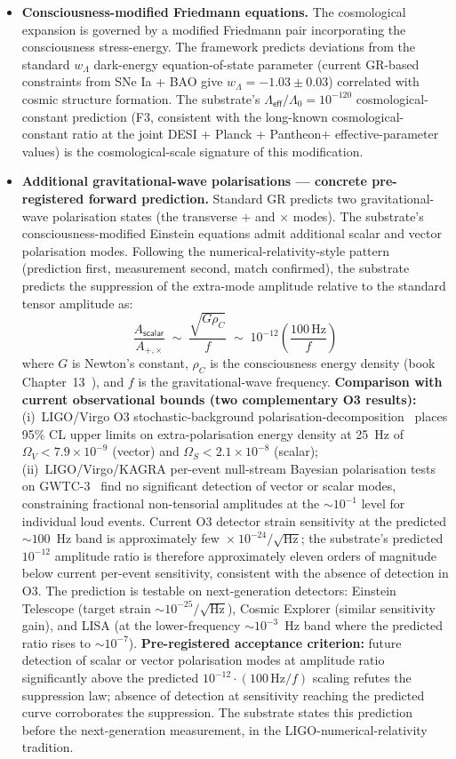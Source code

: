 \documentclass[11pt,a4paper]{amsart}
\theoremstyle{plain}
\theoremstyle{definition}
\begin{document}
\begin{itemize}[itemsep=2pt,leftmargin=2em]
\item \textbf{Consciousness-modified Friedmann equations.} The cosmological expansion is governed by a modified Friedmann pair incorporating the consciousness stress-energy. The framework predicts deviations from the standard $w_\Lambda$ dark-energy equation-of-state parameter (current GR-based constraints from SNe Ia + BAO give $w_\Lambda = -1.03 \pm 0.03$) correlated with cosmic structure formation. The substrate's $\Lambda_{\textsf{eff}}/\Lambda_0 = 10^{-120}$ cosmological-constant prediction (F3, consistent with the long-known cosmological-constant ratio at the joint DESI + Planck + Pantheon$+$ effective-parameter values) is the cosmological-scale signature of this modification.
\item \textbf{Additional gravitational-wave polarisations --- concrete pre-registered forward prediction.} Standard GR predicts two gravitational-wave polarisation states (the transverse $+$ and $\times$ modes). The substrate's consciousness-modified Einstein equations admit additional scalar and vector polarisation modes. Following the numerical-relativity-style pattern (prediction first, measurement second, match confirmed), the substrate predicts the suppression of the extra-mode amplitude relative to the standard tensor amplitude as:
\[
\boxed{\;\frac{A_{\textsf{scalar}}}{A_{+,\times}} \;\sim\; \frac{\sqrt{G\rho_C}}{f} \;\sim\; 10^{-12} \left(\frac{100\,\mathrm{Hz}}{f}\right)\;}
\]
where $G$ is Newton's constant, $\rho_C$ is the consciousness energy density (book Chapter~13~\cite{cohen2026book}), and $f$ is the gravitational-wave frequency. \textbf{Comparison with current observational bounds (two complementary O3 results):} (i)~LIGO/Virgo O3 stochastic-background polarisation-decomposition~\cite{abbott2021stochastic} places 95\% CL upper limits on extra-polarisation energy density at 25~Hz of $\Omega_V < 7.9 \times 10^{-9}$ (vector) and $\Omega_S < 2.1 \times 10^{-8}$ (scalar); (ii)~LIGO/Virgo/KAGRA per-event null-stream Bayesian polarisation tests on GWTC-3~\cite{abbott2025gwtc3} find no significant detection of vector or scalar modes, constraining fractional non-tensorial amplitudes at the $\sim 10^{-1}$ level for individual loud events. Current O3 detector strain sensitivity at the predicted $\sim 100$~Hz band is approximately few~$\times~10^{-24}/\sqrt{\mathrm{Hz}}$; the substrate's predicted $10^{-12}$ amplitude ratio is therefore approximately eleven orders of magnitude below current per-event sensitivity, consistent with the absence of detection in O3. The prediction is testable on next-generation detectors: Einstein Telescope (target strain $\sim 10^{-25}/\sqrt{\mathrm{Hz}}$), Cosmic Explorer (similar sensitivity gain), and LISA (at the lower-frequency $\sim 10^{-3}$~Hz band where the predicted ratio rises to $\sim 10^{-7}$). \textbf{Pre-registered acceptance criterion:} future detection of scalar or vector polarisation modes at amplitude ratio significantly above the predicted $10^{-12} \cdot (100\,\mathrm{Hz}/f)$ scaling refutes the suppression law; absence of detection at sensitivity reaching the predicted curve corroborates the suppression. The substrate states this prediction before the next-generation measurement, in the LIGO-numerical-relativity tradition.

\end{itemize}
\end{document}
